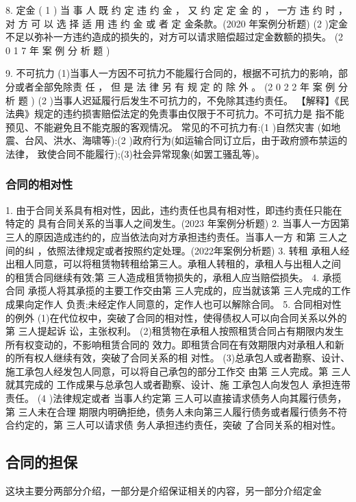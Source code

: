 \documentclass[UTF8,12pt]{ctexart}
\numberwithin{equation}{section} %
\numberwithin{figure}{section}
\numberwithin{table}{section}
\begin{document}
	8. 定金
	( 1 ) 当 事 人 既 约 定 违 约 金 ， 又 约 定 定 金 的 ， 一方 违 约 时 ， 对 方 可 以 选 择 适 用 违 约 金 或 者 定 金条款。(2020 年案例分析题)
	(2 )定金不足以弥补一方违约造成的损失的，对方可以请求赔偿超过定金数额的损失。 (2 0 1 7 年 案 例 分 析 题 )
	
	
	9. 不可抗力 (1)当事人一方因不可抗力不能履行合同的，根据不可抗力的影响，部分或者全部免除责 任 ， 但 是 法 律 另 有 规 定 的 除 外 。 (2 0 2 2 年 案 例 分 析 题 )
	(2 )当事人迟延履行后发生不可抗力的，不免除其违约责任。
	【解释】《民法典》规定的违约损害赔偿法定的免责事由仅限于不可抗力。不可抗力是 指不能预见、不能避免且不能克服的客观情况。 常见的不可抗力有:(1 )自然灾害 (如地 震、台风、洪水、海啸等):(2 )政府行为(如运输合同订立后，由于政府颁布禁运的法律， 致使合同不能履行);(3)社会异常现象(如罢工骚乱等)。
	
	\subsubsection{合同的相对性}
	1. 由于合同关系具有相对性，因此，违约责任也具有相对性，即违约责任只能在特定的 具有合同关系的当事人之间发生。(2023 年案例分析题)
	2. 当事人一方因第 三人的原因造成违约的，应当依法向对方承担违约责任。当事人一方 和第 三人之间的纠 ，依照法律规定或者按照约定处理。(2022年案例分析题)
	3. 转租 承租人经出租人同意，可以将租赁物转租给第三人。承租人转租的，承租人与出租人之间 的租赁合同继续有效;第 三人造成租赁物损失的，承租人应当赔偿损失。
	4. 承揽合同
	承揽人将其承揽的主要工作交由第 三人完成的，应当就该第 三人完成的工作成果向定作人 负责;未经定作人同意的，定作人也可以解除合同。
	5. 合同相对性的例外 (1)在代位权中，突破了合同的相对性，使得债权人可以向合同关系以外的第 三人提起诉 讼，主张权利。 (2)租赁物在承租人按照租赁合同占有期限内发生所有权变动的，不影响租赁合同的 效力。即租赁合同在有效期限内对承租人和新的所有权人继续有效，突破了合同关系的相 对性。 (3)总承包人或者勘察、设计、施工承包人经发包人同意，可以将自己承包的部分工作交 由第 三人完成。第 三人就其完成的 工作成果与总承包人或者勘察、设计、施 工承包人向发包人 承担连带责任。
	(4 )法律规定或者 当事人约定第 三人可以直接请求债务人向其履行债务，第 三人未在合理 期限内明确拒绝，债务人未向第三人履行债务或者履行债务不符合约定的，第 三人可以请求债 务人承担违约责任，突破 了合同关系的相对性。
	
	\subsection{合同的担保}
	这块主要分两部分介绍，一部分是介绍保证相关的内容，另一部分介绍定金
	
\end{document}
